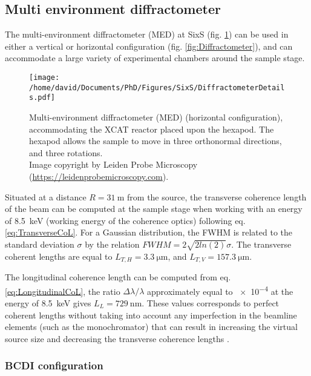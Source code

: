 \subsection{Multi environment diffractometer}\label{sec:MED}

The multi-environment diffractometer (MED) at SixS (fig. \ref{fig:MEDDiffractometer}) can be used in either a vertical or horizontal configuration (fig. \ref{fig:Diffractometer}), and can accommodate a large variety of experimental chambers around the sample stage.

\begin{figure}[!htb]
    \centering
    \texttt{[image: /home/david/Documents/PhD/Figures/SixS/DiffractometerDetails.pdf]}
    \caption{
        Multi-environment diffractometer (MED) (horizontal configuration), accommodating the XCAT reactor \parencite{VanRijn2010} placed upon the hexapod.
        The hexapod allows the sample to move in three orthonormal directions, and three rotations.\\
        Image copyright by Leiden Probe Microscopy (\url{https://leidenprobemicroscopy.com}).
    }
    \label{fig:MEDDiffractometer}
\end{figure}

Situated at a distance $R = \qty{31}{\m}$ from the source, the transverse coherence length of the beam can be computed at the sample stage when working with an energy of \qty{8.5}{\keV} (working energy of the coherence optics) following eq. \ref{eq:TransverseCoL}.
For a Gaussian distribution, the FWHM is related to the standard deviation $\sigma$ by the relation $FWHM = 2\sqrt{2 ln (2) } \sigma$.
The transverse coherent lengths are equal to $L_{T,H} = \qty{3.3}{\um}$, and $L_{T,V} = \qty{157.3}{\um}$.

The longitudinal coherence length can be computed from eq. \ref{eq:LongitudinalCoL}, the ratio $\Delta\lambda/\lambda$ approximately equal to \num{e-4} at the energy of \qty{8.5}{\keV} gives $L_L = \qty{729}{\nm}$.
These values corresponds to perfect coherent lengths without taking into account any imperfection in the beamline elements (such as the monochromator) that can result in increasing the virtual source size and decreasing the transverse coherence lengths \parencite{Jacques2010}.

\subsubsection{BCDI configuration}

